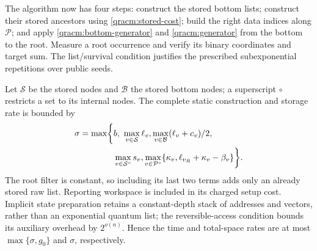 \documentclass[10pt,a4paper]{article}
\theoremstyle{definition}
\begin{document}
The algorithm now has four steps: construct the stored bottom lists;
construct their stored ancestors using \eqref{qracm:stored-cost}; build
the right data indices along $\mathcal P$; and apply
\eqref{qracm:bottom-generator} and \eqref{qracm:generator} from the bottom
to the root.  Measure a root occurrence and verify its binary coordinates
and target sum.  The list/survival condition justifies the prescribed
subexponential repetitions over public seeds.

Let $\mathcal S$ be the stored nodes and $\mathcal B$ the stored bottom
nodes; a superscript $\circ$ restricts a set to its internal nodes.
The complete static construction and storage rate is bounded by
\begin{align}
 \sigma=\max\biggl\{&b,\ \max_{v\in\mathcal S}\ell_v,
          \max_{v\in\mathcal B}(\ell_v+c_v)/2,\notag\\
       &\max_{v\in\mathcal S^\circ}s_v,
          \max_{v\in\mathcal P^\circ}
          \{\kappa_v,\ell_{v_R}+\kappa_v-\beta_v\}\biggr\}.
 \label{qracm:setup}
\end{align}
The root filter is constant, so including its last two terms adds only
an already stored raw list.  Reporting workspace is included in its
charged setup cost.  Implicit state preparation retains a constant-depth
stack of addresses and vectors, rather than an exponential quantum list;
the reversible-access condition bounds its auxiliary overhead by
$2^{o(n)}$.  Hence the time and total-space rates are at most
$\max\{\sigma,g_0\}$ and $\sigma$, respectively.
\end{document}
